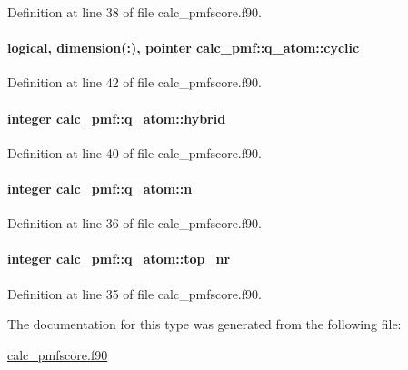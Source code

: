 Definition at line 38 of file calc\-\_\-pmfscore.\-f90.

\hypertarget{structcalc__pmf_1_1q__atom_a3d3b0b69d9b8803b8329fd43b31e9ba5}{
\paragraph[{cyclic}]{\setlength{\rightskip}{0pt plus 5cm}logical, dimension(\-:), pointer calc\-\_\-pmf\-::q\-\_\-atom\-::cyclic}}\label{structcalc__pmf_1_1q__atom_a3d3b0b69d9b8803b8329fd43b31e9ba5}


Definition at line 42 of file calc\-\_\-pmfscore.\-f90.

\hypertarget{structcalc__pmf_1_1q__atom_a36f1d4d20254ef57da10efc02b924d05}{
\paragraph[{hybrid}]{\setlength{\rightskip}{0pt plus 5cm}integer calc\-\_\-pmf\-::q\-\_\-atom\-::hybrid}}\label{structcalc__pmf_1_1q__atom_a36f1d4d20254ef57da10efc02b924d05}


Definition at line 40 of file calc\-\_\-pmfscore.\-f90.

\hypertarget{structcalc__pmf_1_1q__atom_a0ebcafc2c36be4d01f708362f29ce06d}{
\paragraph[{n}]{\setlength{\rightskip}{0pt plus 5cm}integer calc\-\_\-pmf\-::q\-\_\-atom\-::n}}\label{structcalc__pmf_1_1q__atom_a0ebcafc2c36be4d01f708362f29ce06d}


Definition at line 36 of file calc\-\_\-pmfscore.\-f90.

\hypertarget{structcalc__pmf_1_1q__atom_aec4318350bbf3e202fd44c43652aaa83}{
\paragraph[{top\-\_\-nr}]{\setlength{\rightskip}{0pt plus 5cm}integer calc\-\_\-pmf\-::q\-\_\-atom\-::top\-\_\-nr}}\label{structcalc__pmf_1_1q__atom_aec4318350bbf3e202fd44c43652aaa83}


Definition at line 35 of file calc\-\_\-pmfscore.\-f90.



The documentation for this type was generated from the following file\-:\begin{DoxyCompactItemize}
\item 
\hyperlink{calc__pmfscore_8f90}{calc\-\_\-pmfscore.\-f90}\end{DoxyCompactItemize}
